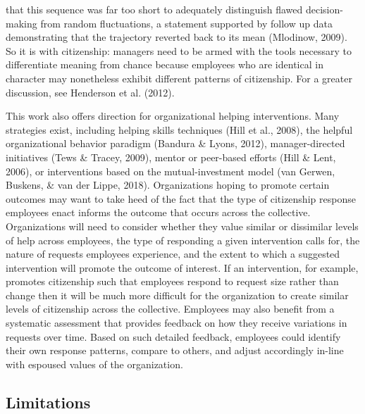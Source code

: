 \documentclass[english,,man]{apa6}
\begin{document}
that this sequence was far too short to adequately distinguish flawed decision-making from random fluctuations, a statement supported by follow up data demonstrating that the trajectory reverted back to its mean (Mlodinow, 2009). So it is with citizenship: managers need to be armed with the tools necessary to differentiate meaning from chance because employees who are identical in character may nonetheless exhibit different patterns of citizenship. For a greater discussion, see Henderson et al. (2012).

This work also offers direction for organizational helping interventions. Many strategies exist, including helping skills techniques (Hill et al., 2008), the helpful organizational behavior paradigm (Bandura \& Lyons, 2012), manager-directed initiatives (Tews \& Tracey, 2009), mentor or peer-based efforts (Hill \& Lent, 2006), or interventions based on the mutual-investment model (van Gerwen, Buskens, \& van der Lippe, 2018). Organizations hoping to promote certain outcomes may want to take heed of the fact that the type of citizenship response employees enact informs the outcome that occurs across the collective. Organizations will need to consider whether they value similar or dissimilar levels of help across employees, the type of responding a given intervention calls for, the nature of requests employees experience, and the extent to which a suggested intervention will promote the outcome of interest. If an intervention, for example, promotes citizenship such that employees respond to request size rather than change then it will be much more difficult for the organization to create similar levels of citizenship across the collective. Employees may also benefit from a systematic assessment that provides feedback on how they receive variations in requests over time. Based on such detailed feedback, employees could identify their own response patterns, compare to others, and adjust accordingly in-line with espoused values of the organization.

\hypertarget{limitations}{%
\subsection{Limitations}\label{limitations}}
\end{document}
